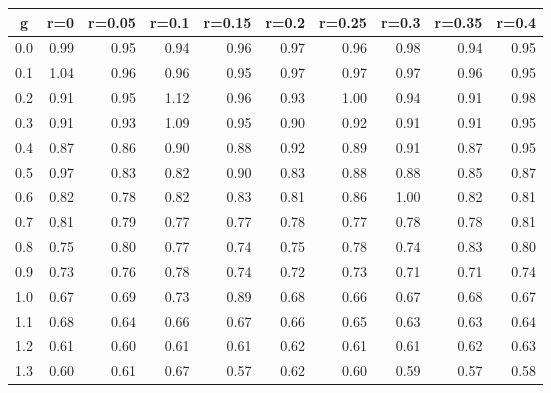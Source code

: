 %
\begin{table}[!tbp]
 \begin{center}
 \begin{tabular}{rrrrrrrrrr}\hline\hline
\multicolumn{1}{c}{g}&\multicolumn{1}{c}{r=0}&\multicolumn{1}{c}{r=0.05}&\multicolumn{1}{c}{r=0.1}&\multicolumn{1}{c}{r=0.15}&\multicolumn{1}{c}{r=0.2}&\multicolumn{1}{c}{r=0.25}&\multicolumn{1}{c}{r=0.3}&\multicolumn{1}{c}{r=0.35}&\multicolumn{1}{c}{r=0.4}\tabularnewline
\hline
0.0&0.99&0.95&0.94&0.96&0.97&0.96&0.98&0.94&0.95\tabularnewline
0.1&1.04&0.96&0.96&0.95&0.97&0.97&0.97&0.96&0.95\tabularnewline
0.2&0.91&0.95&1.12&0.96&0.93&1.00&0.94&0.91&0.98\tabularnewline
0.3&0.91&0.93&1.09&0.95&0.90&0.92&0.91&0.91&0.95\tabularnewline
0.4&0.87&0.86&0.90&0.88&0.92&0.89&0.91&0.87&0.95\tabularnewline
0.5&0.97&0.83&0.82&0.90&0.83&0.88&0.88&0.85&0.87\tabularnewline
0.6&0.82&0.78&0.82&0.83&0.81&0.86&1.00&0.82&0.81\tabularnewline
0.7&0.81&0.79&0.77&0.77&0.78&0.77&0.78&0.78&0.81\tabularnewline
0.8&0.75&0.80&0.77&0.74&0.75&0.78&0.74&0.83&0.80\tabularnewline
0.9&0.73&0.76&0.78&0.74&0.72&0.73&0.71&0.71&0.74\tabularnewline
1.0&0.67&0.69&0.73&0.89&0.68&0.66&0.67&0.68&0.67\tabularnewline
1.1&0.68&0.64&0.66&0.67&0.66&0.65&0.63&0.63&0.64\tabularnewline
1.2&0.61&0.60&0.61&0.61&0.62&0.61&0.61&0.62&0.63\tabularnewline
1.3&0.60&0.61&0.67&0.57&0.62&0.60&0.59&0.57&0.58\tabularnewline
\hline
\end{tabular}

\end{center}

\end{table}

